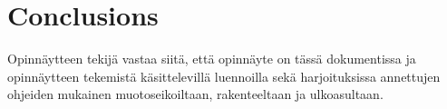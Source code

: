 \documentclass[english,12pt,a4paper,pdftex,sci,utf8]{aaltothesis}
\begin{document}
\section{Conclusions}  \label{sec:conclusions}


Opinn\"aytteen tekij\"a vastaa siit\"a, ett\"a opinn\"ayte on t\"ass\"a dokumentissa
ja opinn\"aytteen tekemist\"a k\"asittelevill\"a luennoilla sek\"a
harjoituksissa annettujen ohjeiden mukainen muotoseikoiltaan,
rakenteeltaan ja ulkoasultaan.\cite{grochowski2004best}


\cleardoublepage
{}



\end{document}
